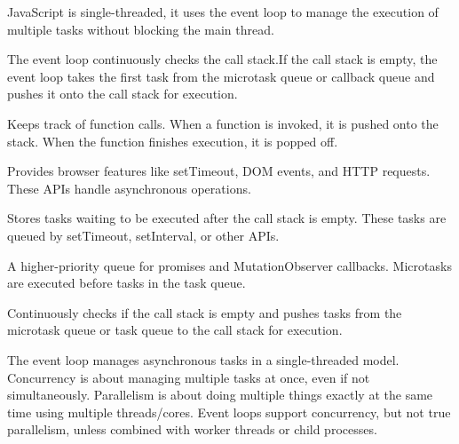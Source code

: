 JavaScript is single-threaded, it uses the event loop to manage the execution of multiple tasks without blocking the main thread.


The event loop continuously checks the call stack.If the call stack is empty, the event loop takes the first task from the microtask queue or callback queue and pushes it onto the call stack for execution.

  Keeps track of function calls. When a function is invoked, it is pushed onto the stack. When the function finishes execution, it is popped off.

  Provides browser features like setTimeout, DOM events, and HTTP requests. These APIs handle asynchronous operations.

  Stores tasks waiting to be executed after the call stack is empty. These tasks are queued by setTimeout, setInterval, or other APIs.

   A higher-priority queue for promises and MutationObserver callbacks. Microtasks are executed before tasks in the task queue.

   Continuously checks if the call stack is empty and pushes tasks from the microtask queue or task queue to the call stack for execution.


The event loop manages asynchronous tasks in a single-threaded model.
Concurrency is about managing multiple tasks at once, even if not simultaneously.
Parallelism is about doing multiple things exactly at the same time using multiple threads/cores.
Event loops support concurrency, but not true parallelism, unless combined with worker threads or child processes.
